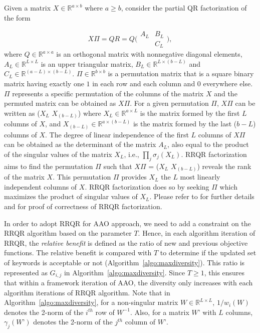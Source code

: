 Given a matrix $X \in \mathbb{R}^{a\times b}$ where $a \ge b$, consider the partial QR factorization of the form

\begin{equation} \label{eq:rrqr}
X \Pi = Q R = Q \bigl(\begin{smallmatrix}
A_L & B_L\\ 
 & C_L
\end{smallmatrix}\bigr),  
\end{equation}
where $Q \in \mathbb{R}^{a\times a}$ is an orthogonal matrix with nonnegative diagonal elements, $A_L \in \mathbb{R}^{L\times L}$ is an upper triangular matrix, $B_L \in \mathbb{R}^{L\times (b-L)}$ and $C_L \in \mathbb{R}^{(a-L)\times (b-L)}$. $\Pi \in \mathbb{R}^{b\times b}$ is a permutation matrix that is a square binary matrix having exactly one $1$ in each row and each column and $0$ everywhere else. $\Pi$ represents a specific permutation of the columns of the matrix $X$ and the permuted matrix can be obtained as $X \Pi$. For a given permutation $\Pi$, $X \Pi$ can be written as ($X_L$  $X_{(b-L)}$) where $X_L \in \mathbb{R}^{a\times L}$ is the matrix formed by the first $L$ columns of $X$, and $X_{(b-L)} \in \mathbb{R}^{a\times (b-L)}$ is the matrix formed by the last ($b-L$) columns of $X$. The degree of linear independence of the first $L$ columns of $X \Pi$ can be obtained as the determinant of the matrix $A_L$, also equal to the product of the singular values of the matrix $X_L$, i.e., $\prod_{j}{\sigma_j(X_L) }$. RRQR factorization aims to find the permutation $\Pi$ such that $X \Pi $ = ($X_L$  $X_{(b-L)}$) reveals the rank of the matrix $X$. This permutation $\Pi$ provides $X_L$ the $L$ most linearly independent columns of $X$. RRQR factorization does so by seeking $\Pi$ which maximizes the product of singular values of $X_L$. Please refer to \cite{BusingerLinear65,GolubNumeri65,ChanRank87,GuEfficient96} for further details and for proof of correctness of RRQR factorization. 

In order to adopt RRQR for AAO approach, we need to add a constraint on the RRQR algorithm based on the parameter $T$. Hence, in each algorithm iteration of RRQR, the \textit{relative benefit} is defined as the ratio of new and previous objective functions. The relative benefit is compared with $T$ to determine if the updated set of keywords is acceptable or not (Algorithm~\ref{algo:maxdiversity}). This ratio is represented as $G_{i,j}$ in Algorithm~\ref{algo:maxdiversity}. Since $T \ge 1$, this ensures that within a framework iteration of AAO, the diversity only increases with each algorithm iterations of RRQR algorithm. Note that in Algorithm~\ref{algo:maxdiversity}, for a non-singular matrix $W \in \mathbb{R}^{L\times L}$, $1/w_i(W)$ denotes the 2-norm of the $i^{th}$ row of $W^{-1}$. Also, for a matrix $W\text{'}$ with $L$ columns, $\gamma_j(W\text{'})$ denotes the 2-norm of the $j^{th}$ column of $W\text{'}$. 

